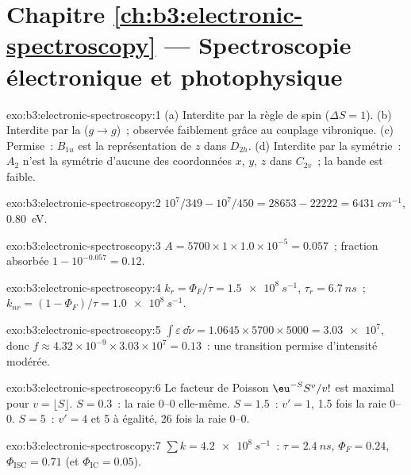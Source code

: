 \section*{Chapitre \ref{ch:b3:electronic-spectroscopy} --- Spectroscopie électronique et photophysique}

\begin{solution}{exo:b3:electronic-spectroscopy:1}
(a) Interdite par la règle de spin ($\Delta S = 1$). (b) Interdite par la
($g \to g$)~; observée faiblement grâce au couplage vibronique.
(c) Permise~: $B_{1u}$ est la
représentation de $z$ dans $D_{2h}$. (d) Interdite par la symétrie~:
$A_2$ n'est la symétrie d'aucune des coordonnées $x$,
$y$, $z$ dans $C_{2v}$~; la bande est faible.
\end{solution}

\begin{solution}{exo:b3:electronic-spectroscopy:2}
$10^7/349 - 10^7/450 = 28653 - 22222 = \qty{6431}{cm^{-1}}$, \qty{0.80}{eV}.
\end{solution}

\begin{solution}{exo:b3:electronic-spectroscopy:3}
$A = 5700 \times 1 \times 1.0\times10^{-5} = 0.057$~; fraction absorbée $1 - 10^{-0.057} =
0.12$.
\end{solution}

\begin{solution}{exo:b3:electronic-spectroscopy:4}
$k_r = \Phi_F/\tau = \qty{1.5e8}{s^{-1}}$, $\tau_r = \qty{6.7}{ns}$~; $k_{nr} = (1 - \Phi_F)/\tau
= \qty{1.0e8}{s^{-1}}$.
\end{solution}

\begin{solution}{exo:b3:electronic-spectroscopy:5}
$\int\varepsilon\,\dd\tilde\nu = 1.0645 \times 5700 \times 5000 = \num{3.03e7}$, donc $f \approx
4.32\times10^{-9} \times 3.03\times10^7 = 0.13$~: une transition permise
d'intensité modérée.
\end{solution}

\begin{solution}{exo:b3:electronic-spectroscopy:6}
Le facteur de Poisson $\eu^{-S}S^v/v!$ est maximal pour $v = \lfloor S\rfloor$. $S = 0.3$~: la
raie 0--0 elle-même. $S = 1.5$~: $v' = 1$, 1.5 fois la raie 0--0. $S = 5$~:
$v' = 4$
et 5 à égalité, 26 fois la raie 0--0.
\end{solution}

\begin{solution}{exo:b3:electronic-spectroscopy:7}
$\sum k = \qty{4.2e8}{s^{-1}}$~: $\tau = \qty{2.4}{ns}$, $\Phi_F = 0.24$, $\Phi_{\mathrm{ISC}} = 0.71$
(et $\Phi_{\mathrm{IC}} = 0.05$).
\end{solution}

